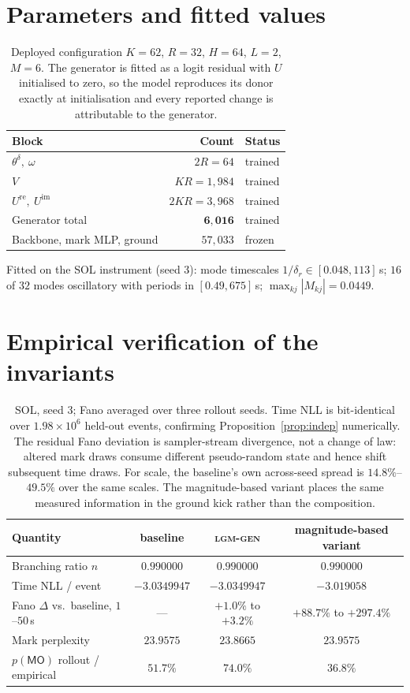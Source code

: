 \documentclass[11pt]{article}
\theoremstyle{remark}
\begin{document}
\section{Parameters and fitted values}

\begin{table}[h]
\centering
\begin{tabular}{lrl}
\toprule
Block & Count & Status \\
\midrule
$\theta^\delta,\ \omega$ & $2R=64$ & trained \\
$V$ & $KR=1{,}984$ & trained \\
$U^{\mathrm{re}},\ U^{\mathrm{im}}$ & $2KR=3{,}968$ & trained \\
\midrule
Generator total & $\mathbf{6{,}016}$ & trained \\
Backbone, mark MLP, ground & $57{,}033$ & frozen \\
\bottomrule
\end{tabular}
\caption{Deployed configuration $K=62$, $R=32$, $H=64$, $L=2$, $M=6$. The
generator is fitted as a logit residual with $U$ initialised to zero, so the
model reproduces its donor exactly at initialisation and every reported change
is attributable to the generator.}
\end{table}

Fitted on the SOL instrument (seed 3): mode timescales $1/\delta_r\in[0.048,
113]$\,s; $16$ of $32$ modes oscillatory with periods in $[0.49,675]$\,s;
$\max_{kj}|M_{kj}|=0.0449$.

\section{Empirical verification of the invariants}

\begin{table}[h]
\centering
\begin{tabular}{lccc}
\toprule
Quantity & baseline & \textsc{lgm-gen} & magnitude-based variant \\
\midrule
Branching ratio $n$ & $0.990000$ & $0.990000$ & $0.990000$ \\
Time NLL / event & $-3.0349947$ & $-3.0349947$ & $-3.019058$ \\
Fano $\Delta$ vs.\ baseline, $1$--$50$\,s & --- & $+1.0\%$ to $+3.2\%$
  & $+88.7\%$ to $+297.4\%$ \\
Mark perplexity & $23.9575$ & $23.8665$ & $23.9575$ \\
$p(\textsf{MO})$ rollout / empirical & $51.7\%$ & $74.0\%$ & $36.8\%$ \\
\bottomrule
\end{tabular}
\caption{SOL, seed 3; Fano averaged over three rollout seeds. Time NLL is
bit-identical over $1.98\times10^{6}$ held-out events, confirming
Proposition~\ref{prop:indep} numerically. The residual Fano deviation is
sampler-stream divergence, not a change of law: altered mark draws consume
different pseudo-random state and hence shift subsequent time draws. For scale,
the baseline's own across-seed spread is $14.8\%$--$49.5\%$ over the same
scales. The magnitude-based variant places the same measured information in the
ground kick rather than the composition.}
\end{table}
\end{document}
